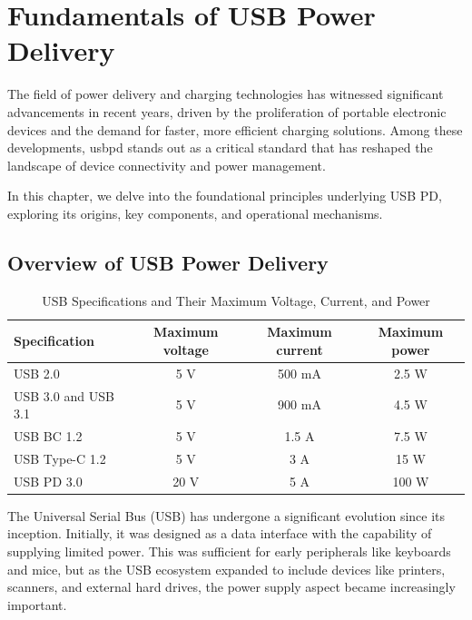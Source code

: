 \chapter{Fundamentals of USB Power Delivery}

The field of power delivery and charging technologies has witnessed significant advancements in recent years, driven by the proliferation of portable electronic devices and the demand for faster, more efficient charging solutions. Among these developments, \gls{usbpd} stands out as a critical standard that has reshaped the landscape of device connectivity and power management.

In this chapter, we delve into the foundational principles underlying USB PD, exploring its origins, key components, and operational mechanisms.

\section{Overview of USB Power Delivery}
 \begin{table}[htb]
    \centering
    \caption{USB Specifications and Their Maximum Voltage, Current, and Power}
    \label{tab:usb_specifications}  
    \begin{tabular}{|l|c|c|c|}
        \hline
        \textbf{Specification} & \textbf{Maximum voltage} & \textbf{Maximum current} & \textbf{Maximum power} \\
        \hline
        USB 2.0 & 5 V & 500 mA & 2.5 W \\
        \hline
        USB 3.0 and USB 3.1 & 5 V & 900 mA & 4.5 W \\
        \hline
        USB BC 1.2 & 5 V & 1.5 A & 7.5 W \\
        \hline
        USB Type-C 1.2 & 5 V & 3 A & 15 W \\
        \hline
        USB PD 3.0 & 20 V & 5 A & 100 W \\
        \hline
    \end{tabular}
    
\end{table}
The Universal Serial Bus (USB) has undergone a significant evolution since its inception. Initially, it was designed as a data interface with the capability of supplying limited power. This was sufficient for early peripherals like keyboards and mice, but as the USB ecosystem expanded to include devices like printers, scanners, and external hard drives, the power supply aspect became increasingly important. 

